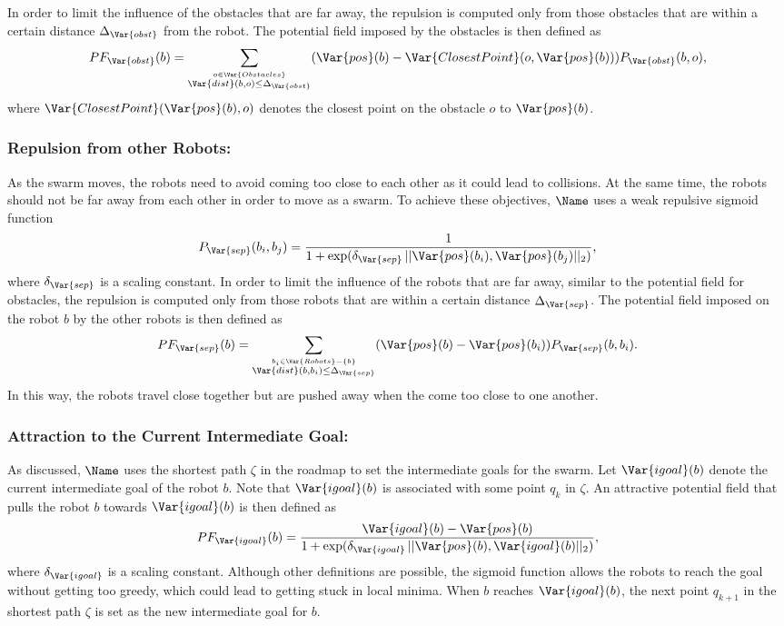In order to limit the influence of the obstacles that are far away,
the repulsion is computed only from those obstacles that are within a
certain distance $\Delta_\Var{obst}$ from the robot. The potential
field imposed by the obstacles is then defined as 
$$
PF_\Var{obst}(b) = \sum_{\stackrel{o \in
    \Var{Obstacles}}{\Var{dist}(b, o) \leq \Delta_\Var{obst}}} (\Var{pos}(b)
- \Var{ClosestPoint}(o, \Var{pos}(b))) P_\Var{obst}(b, o),
$$
where $\Var{ClosestPoint}(\Var{pos}(b), o)$ denotes the closest point on the
obstacle $o$ to $\Var{pos}(b)$.

\subsubsection{Repulsion from other Robots:}
\label{sec:PFrobots} As the swarm moves,
the robots need to avoid coming too close to each other as it
could lead to collisions. At the same time, the robots should not be
far away from each other in order to move as a swarm. To achieve these
objectives, $\Name$ uses a weak repulsive sigmoid function
$$
P_\Var{sep}(b_i, b_j) = \frac{1}{1 +
  \exp(\delta_\Var{sep}\, ||\Var{pos}(b_i), \Var{pos}(b_j)||_2)},
$$
where $\delta_\Var{sep}$ is a scaling constant.
In order to limit the influence of the robots that are far away,
similar to the potential field for obstacles,
the repulsion is computed only from those robots that are within a
certain distance $\Delta_\Var{sep}$. The potential
field imposed on the robot $b$ by the other robots is then defined as 
$$
PF_\Var{sep}(b) = \sum_{\stackrel{b_i \in
    \Var{Robots} - \{b\}}{\Var{dist}(b, b_i) \leq \Delta_\Var{sep}}} (\Var{pos}(b)
- \Var{pos}(b_i)) P_\Var{sep}(b, b_i).
$$
In this way, the robots travel close together but are
pushed away when the come too close to one another.

\subsubsection{Attraction to the Current Intermediate Goal:}
\label{sec:PFigoal} As
discussed, $\Name$ uses the shortest path $\zeta$ in the roadmap to
set the intermediate goals for the swarm. Let $\Var{igoal}(b)$ denote
the current intermediate goal of the robot $b$. Note that
$\Var{igoal}(b)$ is associated with some point $q_k$ in $\zeta$. An
attractive potential field that
pulls the robot $b$ towards $\Var{igoal}(b)$ is then defined as 
$$
PF_\Var{igoal}(b) = \frac{\Var{igoal}(b) - \Var{pos}(b)}{1 +
  \exp(\delta_\Var{igoal}\, ||\Var{pos}(b), \Var{igoal}(b)||_2)},
$$ where $\delta_\Var{igoal}$ is a scaling constant. Although other
definitions are possible, the sigmoid function allows the robots to
reach the goal without getting too greedy, which could lead to getting
stuck in local minima. When $b$ reaches $\Var{igoal}(b)$, the next
point $q_{k+1}$ in the shortest path $\zeta$ is set as the new
intermediate goal for $b$.

